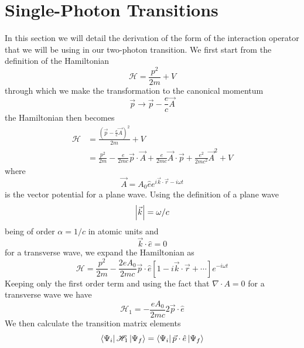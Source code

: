 \section{Single-Photon Transitions}
In this section we will detail the derivation of the form of the interaction operator that we will be using in our two-photon transition. We first start from the definition of the Hamiltonian
\begin{equation}
    \mathscr{H}=\frac{p^2}{2m}+V
\end{equation}
through which we make the transformation to the canonical momentum
\begin{equation}
    \Vec{p}\rightarrow \Vec{p}-\frac{e}{c}\Vec{A}
\end{equation}
the Hamiltonian then becomes
\begin{equation}
    \begin{split}
            \mathscr{H}&=\frac{(\Vec{p}-\frac{e}{c}\Vec{A})^2}{2m}+V\\
            &=\frac{p^2}{2m}-\frac{e}{2mc}\Vec{p}\cdot\Vec{A}+\frac{e}{2mc}\Vec{A}\cdot\Vec{p}+\frac{e^2}{2mc^2}\Vec{A}^2+V
    \end{split}
\end{equation}
where
\begin{equation}
    \Vec{A}=A_0 \hat{e}e^{i\Vec{k}\cdot\Vec{r}-i\omega t}
\end{equation}
is the vector potential for a plane wave. Using the definition of a plane wave
\begin{equation}
    \abs{\Vec{k}}=\omega/c
\end{equation}
being of order $\alpha=1/c$ in atomic units and
\begin{equation}
    \Vec{k}\cdot\hat{e}=0
\end{equation}
for a transverse wave, we expand the Hamiltonian as
\begin{equation}
    \mathscr{H}= \frac{p^2}{2m}-\frac{2eA_0}{2mc}\Vec{p}\cdot\hat{e}[1-i\Vec{k}\cdot\Vec{r}+\cdots]e^{-i\omega t}
\end{equation}
Keeping only the first order term and using the fact that $\nabla\cdot A=0$ for a transverse wave we have
\begin{equation}
    \mathscr{H}_1=-\frac{eA_0}{2mc}2\Vec{p}\cdot\hat{e}
\end{equation}
We then calculate the transition matrix elements
\begin{equation}
    \bra{\Psi_i}\mathscr{H}_1\ket{\Psi_f}=\bra{\Psi_i}\Vec{p}\cdot\hat{e}\ket{\Psi_f}
\end{equation}
